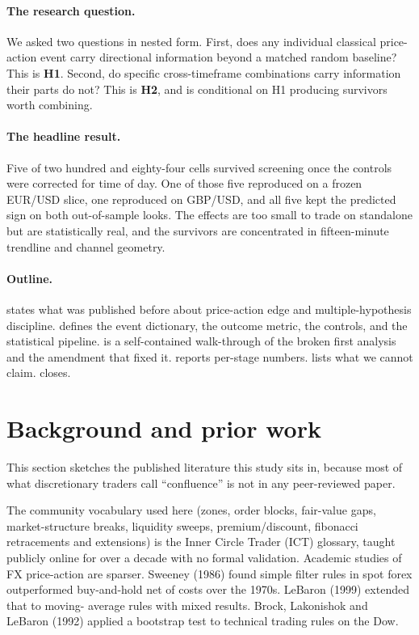 \documentclass[11pt,a4paper]{article}
\begin{document}
\paragraph{The research question.} We asked two questions in nested form.
First, does any individual classical price-action event carry
directional information beyond a matched random baseline? This is
\textbf{H1}. Second, do specific cross-timeframe combinations carry
information their parts do not? This is \textbf{H2}, and is conditional
on H1 producing survivors worth combining.

\paragraph{The headline result.} Five of two hundred and eighty-four
cells survived screening once the controls were corrected for time of
day. One of those five reproduced on a frozen EUR/USD slice, one
reproduced on GBP/USD, and all five kept the predicted sign on both
out-of-sample looks. The effects are too small to trade on standalone
but are statistically real, and the survivors are concentrated in
fifteen-minute trendline and channel geometry.

\paragraph{Outline.}  states what was published
before about price-action edge and multiple-hypothesis discipline.
 defines the event dictionary, the outcome metric, the
controls, and the statistical pipeline.  is a
self-contained walk-through of the broken first analysis and the
amendment that fixed it.  reports per-stage numbers.
 lists what we cannot claim. 
closes.

\section{Background and prior work}\label{sec:background}

This section sketches the published literature this study sits in,
because most of what discretionary traders call \enquote{confluence} is
not in any peer-reviewed paper.

The community vocabulary used here (zones, order blocks, fair-value
gaps, market-structure breaks, liquidity sweeps, premium/discount,
fibonacci retracements and extensions) is the Inner Circle Trader (ICT)
glossary, taught publicly online for over a decade with no formal
validation. Academic studies of FX price-action are sparser. Sweeney
(1986) found simple filter rules in spot forex outperformed buy-and-hold
net of costs over the 1970s. LeBaron (1999) extended that to moving-
average rules with mixed results. Brock, Lakonishok and LeBaron (1992)
applied a bootstrap test to technical trading rules on the Dow.
\end{document}
